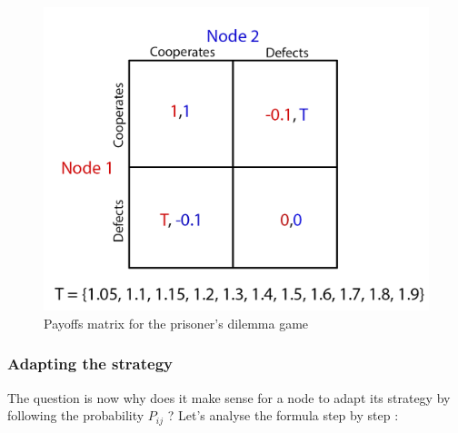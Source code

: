 \documentclass{article}
\begin{document}
\begin{figure}[h]
  \centering
  \includegraphics[scale=0.9]{fig/payoff-IPD.png}
  \caption{Payoffs matrix for the prisoner's dilemma game}
  \label{fig:payoff-IPD}
\end{figure}

\subsubsection{Adapting the strategy}
The question is now why does it make sense for a node to adapt its strategy by following the probability $P_{ij}$ ? Let's analyse the formula step by step : 
\end{document}
